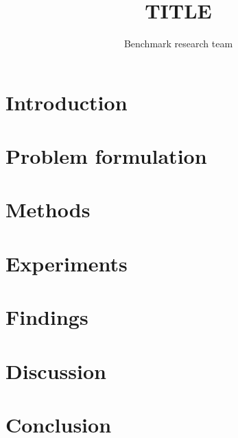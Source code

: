 \documentclass[11pt]{article}
\title{{{TITLE}}}
\author{Benchmark research team}
\date{}
\begin{document}
\maketitle


\begin{abstract}
\end{abstract}

\section{Introduction}

\section{Problem formulation}

\section{Methods}

\section{Experiments}

\section{Findings}

\section{Discussion}

\section{Conclusion}



\end{document}
